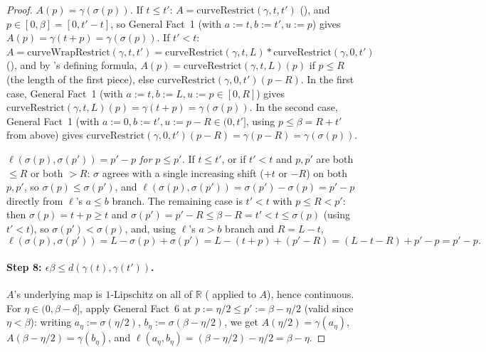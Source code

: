 \begin{proof}
  \emph{$A(p)=\gamma(\sigma(p))$.} If $t\le t'$: $A = \mathrm{curveRestrict}(\gamma,t,t')$
  (), and $p\in[0,\beta]=[0,t'-t]$, so General Fact~1 (with $a:=t,b:=t',u:=p$)
  gives $A(p)=\gamma(t+p)=\gamma(\sigma(p))$. If $t'<t$: $A =
  \mathrm{curveWrapRestrict}(\gamma,t,t') = \mathrm{curveRestrict}(\gamma,t,L) *
  \mathrm{curveRestrict}(\gamma,0,t')$ (), and by 's
  defining formula, $A(p) = \mathrm{curveRestrict}(\gamma,t,L)(p)$ if $p \le R$ (the length of the
  first piece), else $\mathrm{curveRestrict}(\gamma,0,t')(p-R)$. In the first case, General Fact~1
  (with $a:=t,b:=L,u:=p\in[0,R]$) gives $\mathrm{curveRestrict}(\gamma,t,L)(p) = \gamma(t+p) =
  \gamma(\sigma(p))$. In the second case, General Fact~1 (with $a:=0,b:=t',u:=p-R\in(0,t']$, using
  $p\le\beta=R+t'$ from above) gives $\mathrm{curveRestrict}(\gamma,0,t')(p-R) = \gamma(p-R) =
  \gamma(\sigma(p))$.

  \emph{$\ell(\sigma(p),\sigma(p'))=p'-p$ for $p\le p'$.} If $t\le t'$, or if $t'<t$ and $p,p'$ are
  both $\le R$ or both $> R$: $\sigma$ agrees with a single increasing shift ($+t$ or $-R$) on both
  $p,p'$, so $\sigma(p) \le \sigma(p')$, and $\ell(\sigma(p),\sigma(p')) = \sigma(p')-\sigma(p) =
  p'-p$ directly from $\ell$'s $a\le b$ branch. The remaining case is $t'<t$ with $p \le R < p'$:
  then $\sigma(p) = t+p \ge t$ and $\sigma(p') = p'-R \le \beta - R = t' < t \le \sigma(p)$ (using
  $t'<t$), so $\sigma(p') < \sigma(p)$, and, using $\ell$'s $a>b$ branch and $R=L-t$,
  \[
    \ell(\sigma(p),\sigma(p')) = L - \sigma(p) + \sigma(p') = L - (t+p) + (p'-R) = (L-t-R) + p'-p =
    p'-p
    .
  \]

  \paragraph{Step 8: $\epsilon\beta \le d(\gamma(t),\gamma(t'))$.} $A$'s underlying map is
  $1$-Lipschitz on all of $\mathbb{R}$ ( applied to $A$), hence continuous.
  For $\eta \in (0,\beta-\delta]$, apply General Fact~6 at $p:=\eta/2 \le p':=\beta-\eta/2$ (valid
  since $\eta<\beta$): writing $a_\eta:=\sigma(\eta/2)$, $b_\eta:=\sigma(\beta-\eta/2)$, we get
  $A(\eta/2)=\gamma(a_\eta)$, $A(\beta-\eta/2)=\gamma(b_\eta)$, and $\ell(a_\eta,b_\eta) =
  (\beta-\eta/2)-\eta/2 = \beta-\eta$.


\end{proof}
